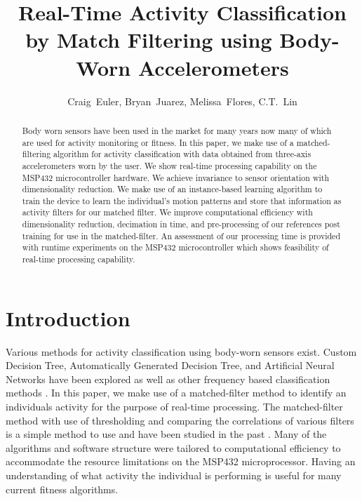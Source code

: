 \documentclass[journal]{IEEEtran}
\begin{document}
%
\title{Real-Time Activity Classification by Match Filtering using Body-Worn Accelerometers}
%
\author{Craig~Euler, Bryan~Juarez, Melissa~Flores, C.T.~Lin}
%
\maketitle
%
\begin{abstract}
Body worn sensors have been used in the market for many years now many of which are used for activity monitoring or fitness.
In this paper, we make use of a matched-filtering algorithm for activity classification with data obtained from three-axis accelerometers worn by the user.
We show real-time processing capability on the MSP432 microcontroller hardware.
We achieve invariance to sensor orientation with dimensionality reduction.
We make use of an instance-based learning algorithm to train the device to learn the individual's motion patterns and store that information as activity filters for our matched filter.
We improve computational efficiency with dimensionality reduction, decimation in time, and pre-processing of our references post training for use in the matched-filter.
An assessment of our processing time is provided with runtime experiments on the MSP432 microcontroller which shows feasibility of real-time processing capability.
\end{abstract}
%
\section{Introduction}
Various methods for activity classification using body-worn sensors exist.
Custom Decision Tree, Automatically Generated Decision Tree, and Artificial Neural Networks \cite{parkka_ermes_korpipaa_mantyjarvi_peltola_korhonen_2006} have been explored as well as other frequency based classification methods \cite{sharma_purwar_lee_lee_chung_2008}.
In this paper, we make use of a matched-filter method to identify an individual\textquotesingle s activity for the purpose of real-time processing.
The matched-filter method with use of thresholding and comparing the correlations of various filters is a simple method to use and have been studied in the past \cite{giannakis_tsatsanis_1990}.
Many of the algorithms and software structure were tailored to computational efficiency to accommodate the resource limitations on the MSP432 microprocessor.
Having an understanding of what activity the individual is performing is useful for many current fitness algorithms.
\end{document}
